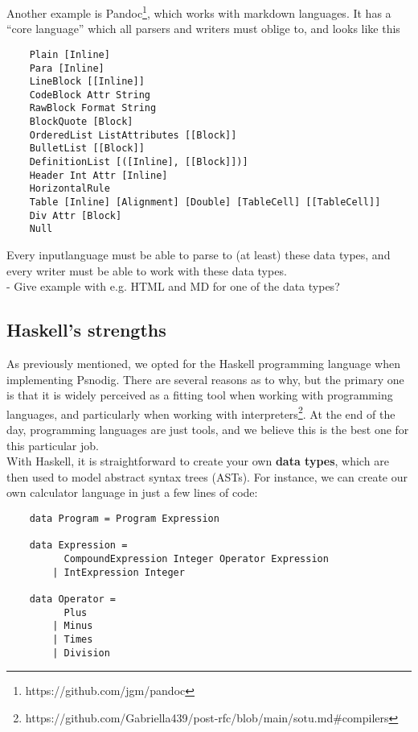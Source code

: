 Another example is Pandoc\footnote{https://github.com/jgm/pandoc}, which works with markdown languages. It has a ``core language'' which all parsers and writers must oblige to, and looks like this

\begin{verbatim}
    Plain [Inline]
    Para [Inline]
    LineBlock [[Inline]]
    CodeBlock Attr String
    RawBlock Format String
    BlockQuote [Block]
    OrderedList ListAttributes [[Block]]
    BulletList [[Block]]
    DefinitionList [([Inline], [[Block]])]
    Header Int Attr [Inline]
    HorizontalRule
    Table [Inline] [Alignment] [Double] [TableCell] [[TableCell]]
    Div Attr [Block]
    Null
\end{verbatim}

Every inputlanguage must be able to parse to (at least) these data types, and every writer must be able to work with these data types. \hfill \\

- Give example with e.g. HTML and MD for one of the data types?

\subsection{Haskell's strengths}
As previously mentioned, we opted for the Haskell programming language when implementing Psnodig. There are several reasons as to why, but the primary one is that it is widely perceived as a fitting tool when working with programming languages, and particularly when working with interpreters\footnote{https://github.com/Gabriella439/post-rfc/blob/main/sotu.md\#compilers}. At the end of the day, programming languages are just tools, and we believe this is the best one for this particular job. \hfill \\

With Haskell, it is straightforward to create your own \textbf{data types}, which are then used to model abstract syntax trees (ASTs). For instance, we can create our own calculator language in just a few lines of code:

\begin{verbatim}
    data Program = Program Expression

    data Expression =
          CompoundExpression Integer Operator Expression
        | IntExpression Integer

    data Operator =
          Plus
        | Minus
        | Times
        | Division
\end{verbatim}

